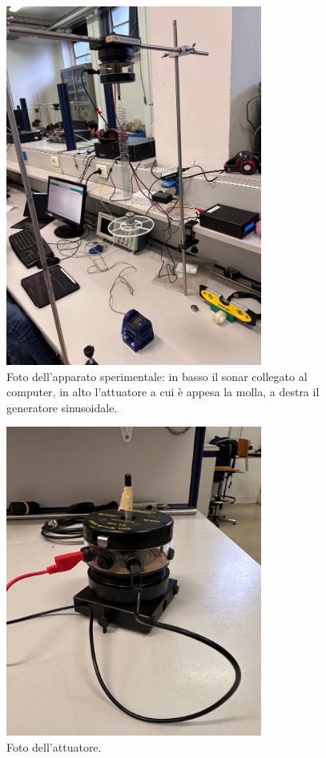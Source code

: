 \documentclass[12pt]{article}
\begin{document}
\begin{figure}[htbp]
  \centering
  \includegraphics[width=0.75\textwidth]{struttura.jpeg}
  \captionsetup{labelformat=empty}
  \caption{Foto dell'apparato sperimentale: in basso il sonar collegato al computer, in alto l'attuatore a cui è appesa la molla, a destra il generatore sinusoidale.}
  \label{fig:struttura.jpeg}
\end{figure}

\begin{figure}[htbp]
  \centering
  \includegraphics[width=0.75\textwidth]{attuatore.jpeg}
  \captionsetup{labelformat=empty}
  \caption{Foto dell'attuatore.}
  \label{fig:attuatore.jpeg}
\end{figure}
\end{document}
